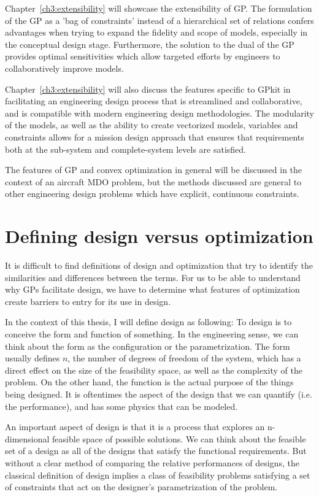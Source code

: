 Chapter~\ref{ch3:extensibility} will showcase the extensibility of \gls{GP}.
The formulation of the \gls{GP} as a 'bag of
constraints' instead of a hierarchical set of relations confers advantages
when trying to expand the fidelity and scope of models, especially in the
conceptual design stage. Furthermore, the solution to the dual of the \gls{GP}
provides optimal sensitivities which allow targeted efforts by engineers to
collaboratively improve models.

Chapter~\ref{ch3:extensibility} will also discuss the features specific to
GPkit in facilitating
an engineering design process that is streamlined and collaborative, and is
compatible with modern engineering design methodologies. The modularity of the
models, as well as the ability to create vectorized models, variables and constraints
allows for a mission design approach that ensures that
requirements both at the sub-system and complete-system levels are satisfied.

The features of \gls{GP} and convex optimization in general will be discussed in
the context of an aircraft \gls{MDO} problem, but the methods discussed
are general to other engineering design problems which have explicit, continuous constraints.

\section{Defining design versus optimization} \label{s:DesVsOpt}

It is difficult to find definitions of design and optimization that
try to identify the similarities and differences between the terms. For us to be
able to understand why \gls{GP}s facilitate design, we have to determine what
features of optimization create barriers to entry for its use in design.

In the context of this thesis, I will define design as following:
To design is to conceive the form and function of something.
In the engineering sense, we can think about the form as the configuration or
the parametrization. The form usually defines $n$, the number of degrees of freedom
of the system, which has a direct effect on the size of the feasibility
space, as well as the complexity of the problem.
On the other hand, the function is the actual purpose of the things
being designed. It is oftentimes the aspect of the design that we can
quantify (i.e. the performance), and has some physics that can be modeled.

An important aspect of design is that it is a process that explores an
n-dimensional feasible space of possible solutions.
We can think about the feasible set of a design as all of the designs
that satisfy the functional requirements. But without a clear method of comparing
the relative performances of designs, the classical
definition of design implies a class of feasibility problems satisfying a set of
constraints that act on the designer's parametrization of the problem.

